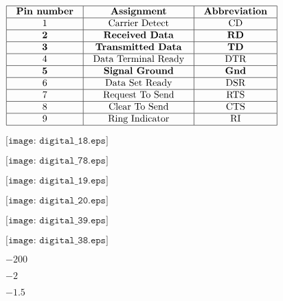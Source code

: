 \documentclass[12pt,a4paper,margin=2cm]{book}
\def\lthtmlcheckvsize{\ifdim\ht\sizebox<\vsize 
  \ifdim\wd\sizebox<\hsize\expandafter\hfill\fi \expandafter\vfill
  \else\expandafter\vss\fi}%
\begin{document}
{\newpage\clearpage
{}%
$\displaystyle \vbox{\offinterlineskip
\halign{\strut
\vrule \quad\hfil # \  \hfil & 
\vrule \quad\hfil # \  \hfil & 
\vrule \quad\hfil # \  \hfil \vrule \cr
\noalign{\hrule }
\textbf{Pin number} & \textbf{Assignment} & \textbf{Abbreviation} \cr
\noalign{\hrule }
1 & Carrier Detect & CD \cr
\noalign{\hrule }
\textbf{2} & \textbf{Received Data} & \textbf{RD} \cr
\noalign{\hrule }
\textbf{3} & \textbf{Transmitted Data} & \textbf{TD} \cr
\noalign{\hrule }
4 & Data Terminal Ready & DTR \cr
\noalign{\hrule }
\textbf{5} & \textbf{Signal Ground} & \textbf{Gnd} \cr
\noalign{\hrule }
6 & Data Set Ready & DSR \cr
\noalign{\hrule }
7 & Request To Send & RTS \cr
\noalign{\hrule }
8 & Clear To Send & CTS \cr
\noalign{\hrule }
9 & Ring Indicator & RI \cr
\noalign{\hrule }
} %
}$%
\lthtmlindisplaymathZ
\lthtmlcheckvsize\clearpage}

{\newpage\clearpage
{}%
$\displaystyle \texttt{[image: digital\_18.eps]}$%
\lthtmlindisplaymathZ
\lthtmlcheckvsize\clearpage}

{\newpage\clearpage
{}%
$\displaystyle \texttt{[image: digital\_78.eps]}$%
\lthtmlindisplaymathZ
\lthtmlcheckvsize\clearpage}

{\newpage\clearpage
{}%
$\displaystyle \texttt{[image: digital\_19.eps]}$%
\lthtmlindisplaymathZ
\lthtmlcheckvsize\clearpage}

{\newpage\clearpage
{}%
$\displaystyle \texttt{[image: digital\_20.eps]}$%
\lthtmlindisplaymathZ
\lthtmlcheckvsize\clearpage}

{\newpage\clearpage
{}%
$\displaystyle \texttt{[image: digital\_39.eps]}$%
\lthtmlindisplaymathZ
\lthtmlcheckvsize\clearpage}

{\newpage\clearpage
{}%
$\displaystyle \texttt{[image: digital\_38.eps]}$%
\lthtmlindisplaymathZ
\lthtmlcheckvsize\clearpage}

{\newpage\clearpage
{}%
$ -200$%
\lthtmlindisplaymathZ
\lthtmlcheckvsize\clearpage}

{\newpage\clearpage
{}%
$ -2$%
\lthtmlindisplaymathZ
\lthtmlcheckvsize\clearpage}

{\newpage\clearpage
{}%
$ -1.5$%
\lthtmlindisplaymathZ
\lthtmlcheckvsize\clearpage}
\end{document}
